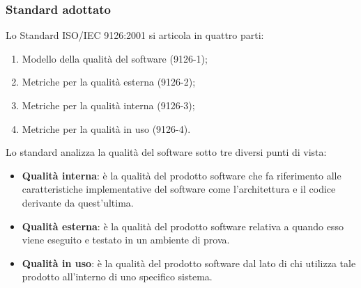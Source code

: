 	\subsubsection{Standard adottato}
	Lo Standard ISO/IEC 9126:2001 si articola in quattro parti:
		\begin{enumerate}
		\item Modello della qualità del software (9126-1);
			\item Metriche per la qualità esterna (9126-2);
			\item Metriche per la qualità interna (9126-3);
			\item Metriche per la qualità in uso (9126-4).
		\end{enumerate}
		Lo standard analizza la qualità del software sotto tre diversi punti di vista:
		\begin{itemize}
			\item \textbf{Qualità interna}: è la qualità del prodotto software che fa riferimento alle caratteristiche implementative del software come l'architettura e il codice derivante da quest'ultima.
			\item \textbf{Qualità esterna}: è la qualità del prodotto software relativa a quando esso viene eseguito e testato in un ambiente di prova. 
			\item \textbf{Qualità in uso}: è la qualità del prodotto software dal lato di chi utilizza tale prodotto all'interno di uno specifico sistema.
		\end{itemize}
